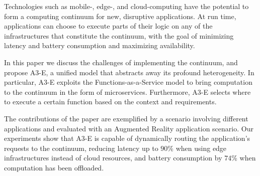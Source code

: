 Technologies such as mobile-, edge-, and cloud-computing have the potential to form a computing continuum for new, disruptive applications. At run time, applications can choose to execute parts of their logic on any of the infrastructures that constitute the continuum, with the goal of minimizing latency and battery consumption and maximizing availability.

In this paper we discuss the challenges of implementing the continuum, and propose A3-E, a unified model that abstracts away its profound heterogeneity. In particular, A3-E exploits the Functions-as-a-Service model to bring computation to the continuum in the form of microservices. Furthermore, A3-E selects where to execute a certain function based on the context and requirements.

The contributions of the paper are exemplified by a scenario involving different applications and evaluated with an Augmented Reality application scenario. Our experiments show that A3-E is capable of dynamically routing the application's requests to the continuum, reducing latency up to $90$\% when using edge infrastructures instead of cloud resources, and battery consumption by $74$\% when computation has been offloaded.





